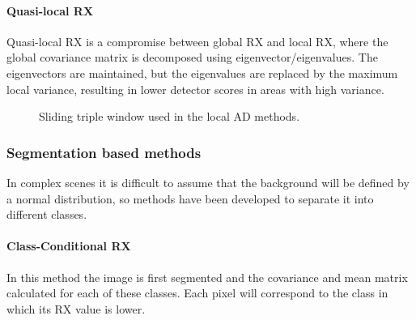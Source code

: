 \paragraph{Quasi-local RX \cite{gorelik_target_2012}}
Quasi-local RX is a compromise between global RX and local RX, where the global covariance matrix is decomposed using eigenvector/eigenvalues. The eigenvectors are maintained, but the eigenvalues are replaced by the maximum local variance, resulting in lower detector scores in areas with high variance.

\begin{figure}[h!]
\centering
\hspace*{100pt}%
\caption[Sliding window used in some algorithms]{Sliding triple window used in the local AD methods.}
  \label{fig:ventana}
\end{figure}

\subsubsection{Segmentation based methods}
In complex scenes it is difficult to assume that the background will be defined by a normal distribution, so methods have been developed to separate it into different classes.

\paragraph{Class-Conditional RX \cite{lo_hyperspectral_2008}}
In this method the image is first segmented and the covariance and mean matrix calculated for each of these classes. Each pixel will correspond to the class in which its RX value is lower.

